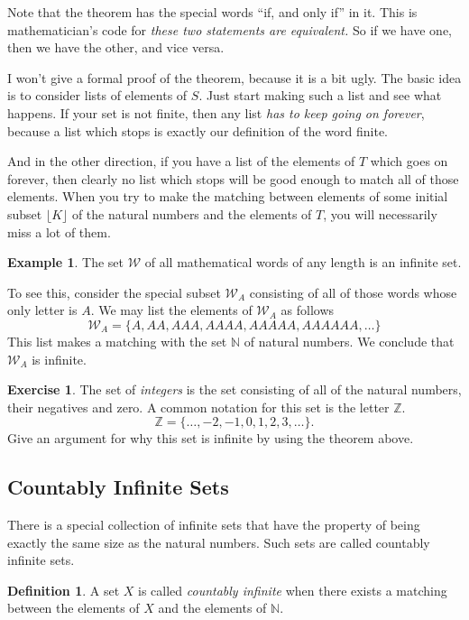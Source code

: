 \documentclass[12pt,letterpaper]{article}
\theoremstyle{definition}
\newtheorem{example}{Example}
\newtheorem{exercise}[question]{Exercise}
\newtheorem*{definition}{Definition}
\begin{document}
Note that the theorem has the special words ``if, and only if'' in it. 
This is mathematician's code for \emph{these two statements are equivalent.} 
So if we have one, then we have the other, and vice versa.

I won't give a formal proof of the theorem, because it is a bit ugly.
The basic idea is to consider lists of elements of $S$. Just start making such a list and see what happens. If your set is not finite, then any list \emph{has to keep going on forever}, because a list which stops is exactly our definition of the word finite.

And in the other direction, if you have a list of the elements of $T$ which goes on forever, then clearly no list which stops will be good enough to match all of those elements. 
When you try to make the matching between elements of some initial subset $\lfloor K \rfloor$ of the natural numbers and the elements of $T$, you will necessarily miss a lot of them.

\begin{example}
The set $\mathcal{W}$ of all mathematical words of any length is an infinite set.

To see this, consider the special subset $\mathcal{W}_A$ consisting of all of those words whose only letter is $A$.
We may list the elements of $\mathcal{W}_A$ as follows
\[
\mathcal{W}_A = \{ A, AA, AAA, AAAA, AAAAA, AAAAAA, \ldots \}
\]
This list makes a matching with the set $\mathbb{N}$ of natural numbers. 
We conclude that $\mathcal{W}_A$ is infinite.
\end{example}

\begin{exercise}
The set of \emph{integers} is the set consisting of all of the natural numbers, their negatives and zero. A common notation for this set is the letter $\mathbb{Z}$.
\[ 
\mathbb{Z} = \{ \ldots , -2, -1, 0, 1, 2, 3, \dots \}.
\]
Give an argument for why this set is infinite by using the theorem above.
\end{exercise}

\subsection*{Countably Infinite Sets}

There is a special collection of infinite sets that have the property of being exactly the same size as the natural numbers.
Such sets are called countably infinite sets.
\begin{definition}
A set $X$ is called \emph{countably infinite} when there exists a matching between the elements of $X$ and the elements of $\mathbb{N}$.
\end{definition}
\end{document}
